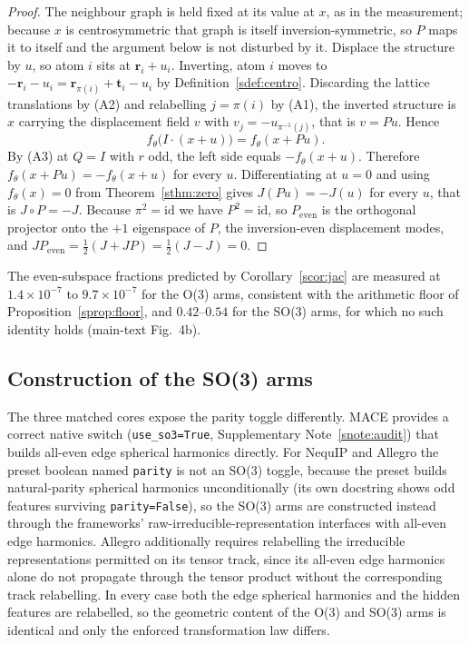 \begin{proof}
The neighbour graph is held fixed at its value at $x$, as in the measurement; because $x$ is centrosymmetric that graph is itself inversion-symmetric, so $P$ maps it to itself and the argument below is not disturbed by it. Displace the structure by $u$, so atom $i$ sits at $\mathbf{r}_i + u_i$. Inverting, atom $i$ moves to $-\mathbf{r}_i - u_i = \mathbf{r}_{\pi(i)} + \mathbf{t}_i - u_i$ by Definition~\ref{sdef:centro}. Discarding the lattice translations by (A2) and relabelling $j = \pi(i)$ by (A1), the inverted structure is $x$ carrying the displacement field $v$ with $v_j = -u_{\pi^{-1}(j)}$, that is $v = Pu$. Hence
\[
f_\theta\bigl(I\!\cdot\!(x+u)\bigr) = f_\theta(x + Pu).
\]
By (A3) at $Q=I$ with $r$ odd, the left side equals $-f_\theta(x+u)$. Therefore $f_\theta(x+Pu) = -f_\theta(x+u)$ for every $u$. Differentiating at $u=0$ and using $f_\theta(x)=0$ from Theorem~\ref{sthm:zero} gives $J(Pu) = -J(u)$ for every $u$, that is $J\circ P = -J$.
Because $\pi^{2}=\mathrm{id}$ we have $P^{2}=\mathrm{id}$, so $P_{\mathrm{even}}$ is the orthogonal projector onto the $+1$ eigenspace of $P$, the inversion-even displacement modes, and
$J P_{\mathrm{even}} = \tfrac{1}{2}(J + J P) = \tfrac{1}{2}(J - J) = 0$.
\end{proof}

The even-subspace fractions predicted by Corollary~\ref{scor:jac} are measured at $1.4\times10^{-7}$ to $9.7\times10^{-7}$ for the O(3) arms, consistent with the arithmetic floor of Proposition~\ref{sprop:floor}, and $0.42$--$0.54$ for the SO(3) arms, for which no such identity holds (main-text Fig.~4b).

\subsection*{Construction of the SO(3) arms}\label{snote:construction}

The three matched cores expose the parity toggle differently. MACE provides a correct native switch (\texttt{use\_so3=True}, Supplementary Note~\ref{snote:audit}) that builds all-even edge spherical harmonics directly. For NequIP and Allegro the preset boolean named \texttt{parity} is not an SO(3) toggle, because the preset builds natural-parity spherical harmonics unconditionally (its own docstring shows odd features surviving \texttt{parity=False}), so the SO(3) arms are constructed instead through the frameworks' raw-irreducible-representation interfaces with all-even edge harmonics. Allegro additionally requires relabelling the irreducible representations permitted on its tensor track, since its all-even edge harmonics alone do not propagate through the tensor product without the corresponding track relabelling. In every case both the edge spherical harmonics and the hidden features are relabelled, so the geometric content of the O(3) and SO(3) arms is identical and only the enforced transformation law differs.


